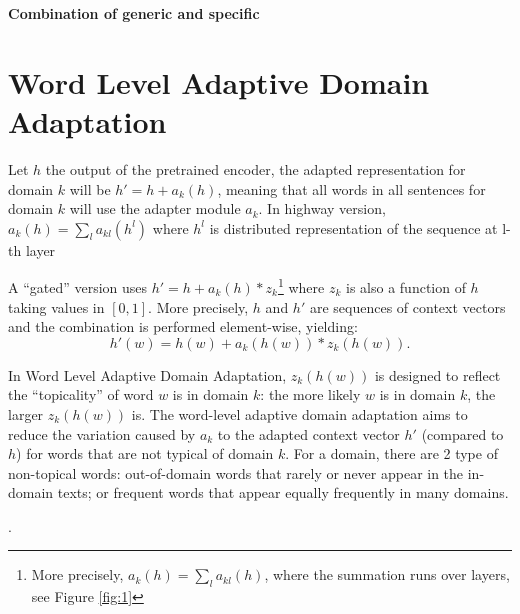 \documentclass[12pt,a4paper,twoside]{report}
\theoremstyle{definition}
\newcommand{\fyTodo}[1]{\Todo[FY:]{\textcolor{orange}{#1}}}
\begin{document}
\begin{center}
{\LARGE \bf Combination of generic and specific}\\
\end{center}
\setlength{\belowdisplayskip}{8pt} \setlength{\belowdisplayshortskip}{8pt}
\setlength{\abovedisplayskip}{8pt} \setlength{\abovedisplayshortskip}{8pt}
\setlength{\parskip}{0.1cm}
\setlength{\parindent}{1em}
\section*{Word Level Adaptive Domain Adaptation}
Let $h$ the output of the pretrained encoder, the adapted representation for domain $k$ will be $h' = h + a_k(h)$, meaning that all words in all sentences for domain $k$ will use the adapter module $a_k$. In highway version, $a_k(h) = \sum_{l} a_{kl}(h^l)$ where $h^l$ is distributed representation of the sequence at l-th layer

 A ``gated'' version uses $h' = h + a_k(h) * z_k$\footnote{More precisely, $a_k(h) = \sum_{l} a_{kl}(h)$, where the summation runs over layers, see Figure \ref{fig:1}} \fyTodo{$a_k(h)=$ somme tous les composants résiduels} where $z_k$ is also a function of $h$ taking values in $[0,1]$. More precisely, $h$ and $h'$ are sequences of context vectors and the combination is performed element-wise, yielding:
\begin{equation}
  h'(w) = h(w) + a_k(h(w)) * z_k(h(w)). \label{eq:gated-residual}
\end{equation}

In Word Level Adaptive Domain Adaptation, $z_k(h(w))$ is designed to reflect the ``topicality'' of  word $w$ is in domain $k$: the more likely $w$ is in domain $k$, the larger $z_k(h(w))$ is. The word-level adaptive domain adaptation aims to reduce the variation caused by $a_k$ to the adapted context vector $h'$ (compared to $h$) for words that are not typical of domain $k$. For a domain, there are 2 type of non-topical words: out-of-domain words that rarely or never appear in the in-domain texts; or frequent words that appear equally frequently in many domains. \fyTodo{This is like a poor Tf-idf - can be because tf is small or because idf is small} 

\fyTodo{Experiment: compute posterior probability of words that have poor $tf-idf$ to verify the gating operation}. 
\end{document}
